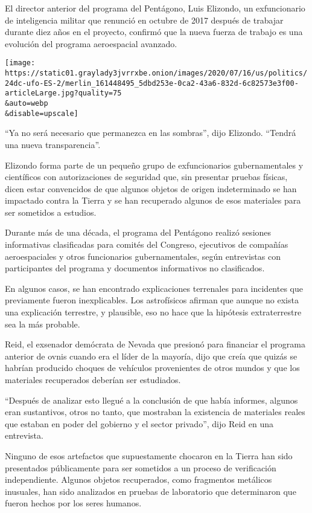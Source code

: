 El director anterior del programa del Pentágono, Luis Elizondo, un
exfuncionario de inteligencia militar que renunció en octubre de 2017
después de trabajar durante diez años en el proyecto, confirmó que la
nueva fuerza de trabajo es una evolución del programa aeroespacial
avanzado.

\texttt{[image: https://static01.graylady3jvrrxbe.onion/images/2020/07/16/us/politics/24dc-ufo-ES-2/merlin\_161448495\_5dbd253e-0ca2-43a6-832d-6c82573e3f00-articleLarge.jpg?quality=75\\\&auto=webp\\\&disable=upscale]}

``Ya no será necesario que permanezca en las sombras'', dijo Elizondo.
``Tendrá una nueva transparencia''.

Elizondo forma parte de un pequeño grupo de exfuncionarios
gubernamentales y científicos con autorizaciones de seguridad que, sin
presentar pruebas físicas, dicen estar convencidos de que algunos
objetos de origen indeterminado se han impactado contra la Tierra y se
han recuperado algunos de esos materiales para ser sometidos a estudios.

Durante más de una década, el programa del Pentágono realizó sesiones
informativas clasificadas para comités del Congreso, ejecutivos de
compañías aeroespaciales y otros funcionarios gubernamentales, según
entrevistas con participantes del programa y documentos informativos no
clasificados.

En algunos casos, se han encontrado explicaciones terrenales para
incidentes que previamente fueron inexplicables. Los astrofísicos
afirman que aunque no exista una explicación terrestre, y plausible, eso
no hace que la hipótesis extraterrestre sea la más probable.

Reid, el exsenador demócrata de Nevada que presionó para financiar el
programa anterior de ovnis cuando era el líder de la mayoría, dijo que
creía que quizás se habrían producido choques de vehículos provenientes
de otros mundos y que los materiales recuperados deberían ser
estudiados.

``Después de analizar esto llegué a la conclusión de que había informes,
algunos eran sustantivos, otros no tanto, que mostraban la existencia de
materiales reales que estaban en poder del gobierno y el sector
privado'', dijo Reid en una entrevista.

Ninguno de esos artefactos que supuestamente chocaron en la Tierra han
sido presentados públicamente para ser sometidos a un proceso de
verificación independiente. Algunos objetos recuperados, como fragmentos
metálicos inusuales, han sido analizados en pruebas de laboratorio que
determinaron que fueron hechos por los seres humanos.

